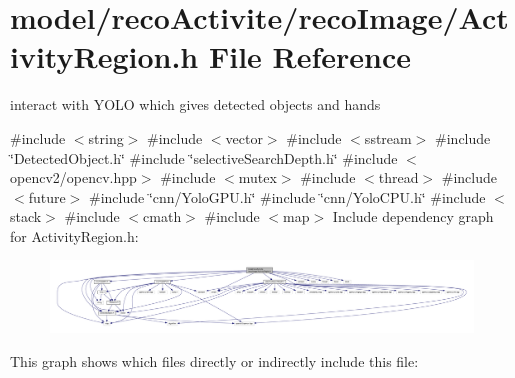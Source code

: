 \section{model/reco\+Activite/reco\+Image/\+Activity\+Region.h File Reference}
\label{_activity_region_8h}


interact with Y\+O\+LO which gives detected objects and hands  


{\ttfamily \#include $<$string$>$}\newline
{\ttfamily \#include $<$vector$>$}\newline
{\ttfamily \#include $<$sstream$>$}\newline
{\ttfamily \#include \char`\"{}Detected\+Object.\+h\char`\"{}}\newline
{\ttfamily \#include \char`\"{}selective\+Search\+Depth.\+h\char`\"{}}\newline
{\ttfamily \#include $<$opencv2/opencv.\+hpp$>$}\newline
{\ttfamily \#include $<$mutex$>$}\newline
{\ttfamily \#include $<$thread$>$}\newline
{\ttfamily \#include $<$future$>$}\newline
{\ttfamily \#include \char`\"{}cnn/\+Yolo\+G\+P\+U.\+h\char`\"{}}\newline
{\ttfamily \#include \char`\"{}cnn/\+Yolo\+C\+P\+U.\+h\char`\"{}}\newline
{\ttfamily \#include $<$stack$>$}\newline
{\ttfamily \#include $<$cmath$>$}\newline
{\ttfamily \#include $<$map$>$}\newline
Include dependency graph for Activity\+Region.\+h\+:
\nopagebreak
\begin{figure}[H]
\begin{center}
\leavevmode
\includegraphics[width=350pt]{_activity_region_8h__incl}
\end{center}
\end{figure}
This graph shows which files directly or indirectly include this file\+:
\nopagebreak
